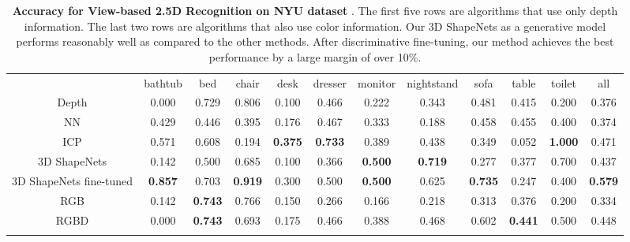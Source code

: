 \documentclass[10pt,twocolumn,letterpaper]{article}
\begin{document}
\begin{table*}[t]
\centering
\setlength{\tabcolsep}{7.8pt}
{
\centering
\footnotesize
\begin{tabular}{c|c|c|c|c|c|c|c|c|c|c|c}
\Xhline{2\arrayrulewidth}
 & bathtub & bed & chair & desk & dresser & monitor & \hspace{-1mm}nightstand\hspace{-1mm} & sofa & table & toilet & all\tabularnewline
\Xhline{3\arrayrulewidth}
\cite{Socher} Depth & 0.000 & 0.729 & 0.806 & 0.100 & 0.466 & 0.222 & 0.343 & 0.481 & 0.415 & 0.200 & 0.376\tabularnewline
\hline 
NN & 0.429  & 0.446 & 0.395 & 0.176 & 0.467 & 0.333 & 0.188 & 0.458 & 0.455 & 0.400 & 0.374\tabularnewline
\hline 
ICP & 0.571  & 0.608 & 0.194 & {\bf 0.375} & {\bf 0.733} & 0.389 & 0.438 & 0.349 & 0.052 & {\bf 1.000} & 0.471\tabularnewline
\hline 
3D ShapeNets & 0.142  & 0.500 & 0.685 &0.100  & 0.366& {\bf 0.500} &  {\bf 0.719} &  0.277& 0.377 & 0.700 & 0.437 \tabularnewline
\hline 
3D ShapeNets fine-tuned & {\bf 0.857}  & 0.703 & {\bf 0.919} & 0.300  & 0.500 & {\bf 0.500} &  0.625 &  {\bf 0.735} & 0.247 & 0.400 & {\bf 0.579} \tabularnewline
\Xhline{3\arrayrulewidth}
\cite{Socher} RGB  & 0.142 & {\bf 0.743} & 0.766 & 0.150 & 0.266 & 0.166 & 0.218 & 0.313 & 0.376 & 0.200 & 0.334\tabularnewline
\hline 
\cite{Socher}  RGBD & 0.000 & {\bf 0.743} & 0.693 & 0.175 & 0.466 & 0.388 & 0.468 & 0.602 & {\bf 0.441} & 0.500 & 0.448\tabularnewline
\Xhline{2\arrayrulewidth}
\end{tabular}
}

\vspace*{-2mm}
\caption{{\bf Accuracy for View-based 2.5D Recognition on NYU dataset} \cite{NYUdataset}.
The first five rows are algorithms that use only depth information. 
The last two rows are algorithms that also use color information.
Our 3D ShapeNets as a generative model performs reasonably well as compared to the other methods. After discriminative fine-tuning, our method achieves the best performance by a large margin of over 10\%.
}
\label{table:ap}




\end{table*}
\end{document}
